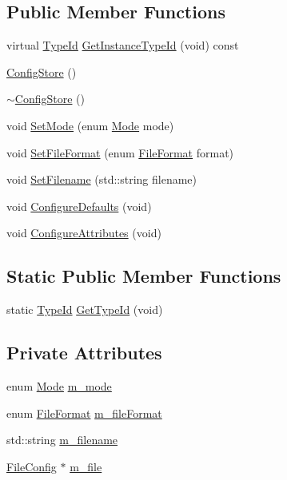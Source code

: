\subsection*{Public Member Functions}
\begin{DoxyCompactItemize}
\item 
virtual \hyperlink{classns3_1_1TypeId}{Type\+Id} \hyperlink{classns3_1_1ConfigStore_a921f68c1101ec218824dae2c0cdff528}{Get\+Instance\+Type\+Id} (void) const 
\item 
\hyperlink{classns3_1_1ConfigStore_ab2c0c2707ae2dc5489acd4cfccd63fd4}{Config\+Store} ()
\item 
\hyperlink{classns3_1_1ConfigStore_a44d0a1afe23fe3abec8930b72f53ba0d}{$\sim$\+Config\+Store} ()
\item 
void \hyperlink{classns3_1_1ConfigStore_afad2b8123ceb85e50141b65a91f3e5a0}{Set\+Mode} (enum \hyperlink{classns3_1_1ConfigStore_a3d4a0f3b64adcf3d5468419dca8c1b07}{Mode} mode)
\item 
void \hyperlink{classns3_1_1ConfigStore_aa0d3139e3ef9470bc0ac610aa4dc702d}{Set\+File\+Format} (enum \hyperlink{classns3_1_1ConfigStore_ac60fd234eb07b100f16833c166f8f507}{File\+Format} format)
\item 
void \hyperlink{classns3_1_1ConfigStore_a1bbe4c144c744c68b8165657fed988eb}{Set\+Filename} (std\+::string filename)
\item 
void \hyperlink{classns3_1_1ConfigStore_a0a6137574d7c847c3823af8b9d1bb886}{Configure\+Defaults} (void)
\item 
void \hyperlink{classns3_1_1ConfigStore_a3e126c39d420519bd7b1a5f7bca08590}{Configure\+Attributes} (void)
\end{DoxyCompactItemize}
\subsection*{Static Public Member Functions}
\begin{DoxyCompactItemize}
\item 
static \hyperlink{classns3_1_1TypeId}{Type\+Id} \hyperlink{classns3_1_1ConfigStore_a2d97fcf9f1dbf395cfa184a191689e41}{Get\+Type\+Id} (void)
\end{DoxyCompactItemize}
\subsection*{Private Attributes}
\begin{DoxyCompactItemize}
\item 
enum \hyperlink{classns3_1_1ConfigStore_a3d4a0f3b64adcf3d5468419dca8c1b07}{Mode} \hyperlink{classns3_1_1ConfigStore_a25f0762ed713df1ce93d5c9738d9acae}{m\+\_\+mode}
\item 
enum \hyperlink{classns3_1_1ConfigStore_ac60fd234eb07b100f16833c166f8f507}{File\+Format} \hyperlink{classns3_1_1ConfigStore_a48a3430b3107a93a5450c8a7b3d08f4e}{m\+\_\+file\+Format}
\item 
std\+::string \hyperlink{classns3_1_1ConfigStore_a0c88a6e7f8ab840fcb1693a3004b8857}{m\+\_\+filename}
\item 
\hyperlink{classns3_1_1FileConfig}{File\+Config} $\ast$ \hyperlink{classns3_1_1ConfigStore_a2e76ef4221dfcd2f4a021b64cd408802}{m\+\_\+file}
\end{DoxyCompactItemize}
